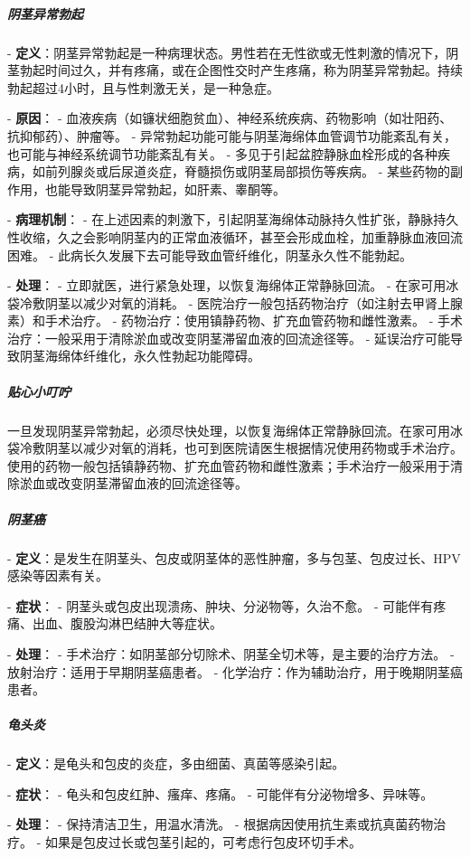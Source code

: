 \subparagraph{阴茎异常勃起}
- \textbf{定义}：阴茎异常勃起是一种病理状态。男性若在无性欲或无性刺激的情况下，阴茎勃起时间过久，并有疼痛，或在企图性交时产生疼痛，称为阴茎异常勃起。持续勃起超过4小时，且与性刺激无关，是一种急症。

- \textbf{原因}：
  - 血液疾病（如镰状细胞贫血）、神经系统疾病、药物影响（如壮阳药、抗抑郁药）、肿瘤等。
  - 异常勃起功能可能与阴茎海绵体血管调节功能紊乱有关，也可能与神经系统调节功能紊乱有关。
  - 多见于引起盆腔静脉血栓形成的各种疾病，如前列腺炎或后尿道炎症，脊髓损伤或阴茎局部损伤等疾病。
  - 某些药物的副作用，也能导致阴茎异常勃起，如肝素、睾酮等。

- \textbf{病理机制}：
  - 在上述因素的刺激下，引起阴茎海绵体动脉持久性扩张，静脉持久性收缩，久之会影响阴茎内的正常血液循环，甚至会形成血栓，加重静脉血液回流困难。
  - 此病长久发展下去可能导致血管纤维化，阴茎永久性不能勃起。

- \textbf{处理}：
  - 立即就医，进行紧急处理，以恢复海绵体正常静脉回流。
  - 在家可用冰袋冷敷阴茎以减少对氧的消耗。
  - 医院治疗一般包括药物治疗（如注射去甲肾上腺素）和手术治疗。
  - 药物治疗：使用镇静药物、扩充血管药物和雌性激素。
  - 手术治疗：一般采用于清除淤血或改变阴茎滞留血液的回流途径等。
  - 延误治疗可能导致阴茎海绵体纤维化，永久性勃起功能障碍。

\subparagraph{贴心小叮咛}

一旦发现阴茎异常勃起，必须尽快处理，以恢复海绵体正常静脉回流。在家可用冰袋冷敷阴茎以减少对氧的消耗，也可到医院请医生根据情况使用药物或手术治疗。使用的药物一般包括镇静药物、扩充血管药物和雌性激素；手术治疗一般采用于清除淤血或改变阴茎滞留血液的回流途径等。

\subparagraph{阴茎癌}
- \textbf{定义}：是发生在阴茎头、包皮或阴茎体的恶性肿瘤，多与包茎、包皮过长、HPV感染等因素有关。

- \textbf{症状}：
  - 阴茎头或包皮出现溃疡、肿块、分泌物等，久治不愈。
  - 可能伴有疼痛、出血、腹股沟淋巴结肿大等症状。

- \textbf{处理}：
  - 手术治疗：如阴茎部分切除术、阴茎全切术等，是主要的治疗方法。
  - 放射治疗：适用于早期阴茎癌患者。
  - 化学治疗：作为辅助治疗，用于晚期阴茎癌患者。

\subparagraph{龟头炎}
- \textbf{定义}：是龟头和包皮的炎症，多由细菌、真菌等感染引起。

- \textbf{症状}：
  - 龟头和包皮红肿、瘙痒、疼痛。
  - 可能伴有分泌物增多、异味等。

- \textbf{处理}：
  - 保持清洁卫生，用温水清洗。
  - 根据病因使用抗生素或抗真菌药物治疗。
  - 如果是包皮过长或包茎引起的，可考虑行包皮环切手术。

